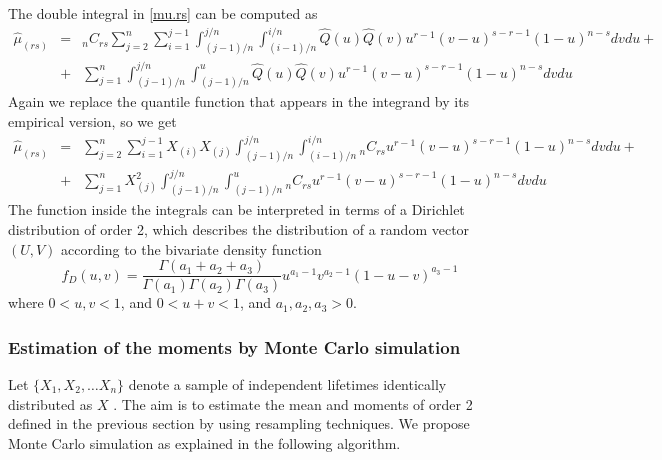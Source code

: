 \documentclass[preprint,12pt]{elsarticle}
\begin{document}
The double integral in \eqref{mu.rs} can be computed as
\begin{eqnarray}\label{mu.rs.hat1}
\nonumber \widehat{\mu}_{(rs)}&=&_nC_{rs}\sum_{j=2}^n \sum_{i=1}^{j-1}\int_{(j-1)/n}^{j/n}\int_{(i-1)/n}^{i/n} \widehat{Q}(u)\widehat{Q}(v) u^{r-1}(v-u)^{s-r-1}(1-u)^{n-s}dvdu +\\
&+& \sum_{j=1}^n \int_{(j-1)/n}^{j/n}\int_{(j-1)/n}^{u} \widehat{Q}(u)\widehat{Q}(v) u^{r-1}(v-u)^{s-r-1}(1-u)^{n-s}dvdu 
\end{eqnarray}
Again we replace the quantile function that appears in the integrand by its empirical version, so we get 
\begin{eqnarray}\label{mu.rs.hat2}
\nonumber \widehat{\mu}_{(rs)}&=&\sum_{j=2}^n \sum_{i=1}^{j-1} X_{(i)}X_{(j)}\int_{(j-1)/n}^{j/n}\int_{(i-1)/n}^{i/n} {_n}C_{rs} u^{r-1}(v-u)^{s-r-1}(1-u)^{n-s} dv du +\\
 &+& \sum_{j=1}^n X_{(j)}^2\int_{(j-1)/n}^{j/n}\int_{(j-1)/n}^{u} {_n}C_{rs} u^{r-1}(v-u)^{s-r-1}(1-u)^{n-s}dvdu 
\end{eqnarray}
The function inside the integrals can be interpreted in terms  of a Dirichlet distribution of order 2, which describes the distribution of a random vector $(U,V)$ according to the  bivariate density function
\begin{equation}\label{diri}
f_D(u,v)=\frac{\Gamma(a_1+a_2+a_3)}{\Gamma(a_1)\Gamma(a_2)\Gamma(a_3)}u^{a_1-1}v^{a_2-1}(1-u-v)^{a_3-1}
\end{equation}
where $0<u,v<1$, and $0<u+v<1$, and $a_1, a_2, a_3 >0$.





\subsubsection{Estimation of the moments by Monte Carlo simulation}
\noindent Let $\{X_1, X_2, \ldots  X_n\}$ denote a sample of independent lifetimes identically distributed as $X$ . The aim is to estimate the mean and moments of order 2 defined in the previous section by using resampling techniques. We propose Monte Carlo simulation as explained in the following algorithm. 
\end{document}
